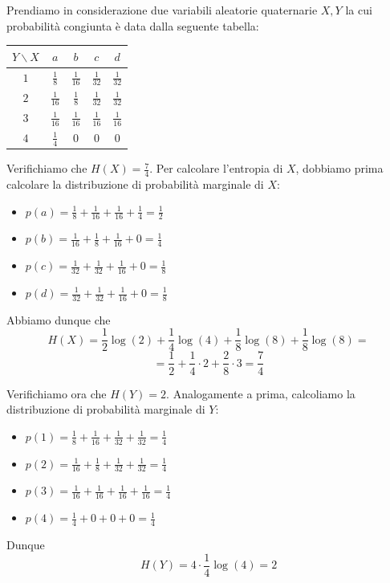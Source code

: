 \begin{example}{}
  Prendiamo in considerazione due variabili aleatorie quaternarie \(X,Y\) la cui probabilità congiunta è data dalla seguente tabella:
  \begin{center}
    \begin{tabular}{c|c c c c}
      \(Y \backslash X\) & \(a\) & \(b\) & \(c\) & \(d\) \\
      \hline
      \(1\) & \(\frac{1}{8}\) & \(\frac{1}{16}\) & \(\frac{1}{32}\) & \(\frac{1}{32}\) \\
      \(2\) & \(\frac{1}{16}\) & \(\frac{1}{8}\) & \(\frac{1}{32}\) & \(\frac{1}{32}\) \\
      \(3\) & \(\frac{1}{16}\) & \(\frac{1}{16}\) & \(\frac{1}{16}\) & \(\frac{1}{16}\) \\
      \(4\) & \(\frac{1}{4}\) & \(0\) & \(0\) & \(0\) \\
    \end{tabular}
  \end{center}

  Verifichiamo che \(H(X) = \frac{7}{4}\).
  Per calcolare l'entropia di \(X\), dobbiamo prima calcolare la distribuzione di probabilità marginale di \(X\):
  \begin{itemize}
    \item \(p(a) = \frac{1}{8} + \frac{1}{16} + \frac{1}{16} + \frac{1}{4} = \frac{1}{2}\)
    \item \(p(b) = \frac{1}{16} + \frac{1}{8} + \frac{1}{16} + 0 = \frac{1}{4}\)
    \item \(p(c) = \frac{1}{32} + \frac{1}{32} + \frac{1}{16} + 0 = \frac{1}{8}\)
    \item \(p(d) = \frac{1}{32} + \frac{1}{32} + \frac{1}{16} + 0 = \frac{1}{8}\)
  \end{itemize}
  Abbiamo dunque che
  \[H(X) = \frac{1}{2}\log(2)+\frac{1}{4}\log(4)+\frac{1}{8}\log(8)+\frac{1}{8}\log(8) = \]
  \[= \frac{1}{2}+\frac{1}{4}\cdot 2 + \frac{2}{8} \cdot 3 = \frac{7}{4}\]
  
  Verifichiamo ora che \(H(Y) = 2\).
  Analogamente a prima, calcoliamo la distribuzione di probabilità marginale di \(Y\):
  \begin{itemize}
    \item \(p(1) = \frac{1}{8} + \frac{1}{16} + \frac{1}{32} + \frac{1}{32} = \frac{1}{4}\)
    \item \(p(2) = \frac{1}{16} + \frac{1}{8} + \frac{1}{32} + \frac{1}{32} = \frac{1}{4}\)
    \item \(p(3) = \frac{1}{16} + \frac{1}{16} + \frac{1}{16} + \frac{1}{16} = \frac{1}{4}\)
    \item \(p(4) = \frac{1}{4} + 0 + 0 + 0 = \frac{1}{4}\)
  \end{itemize}
  Dunque
  \[H(Y) = 4 \cdot \frac{1}{4} \log(4) = 2\]


\end{example}
